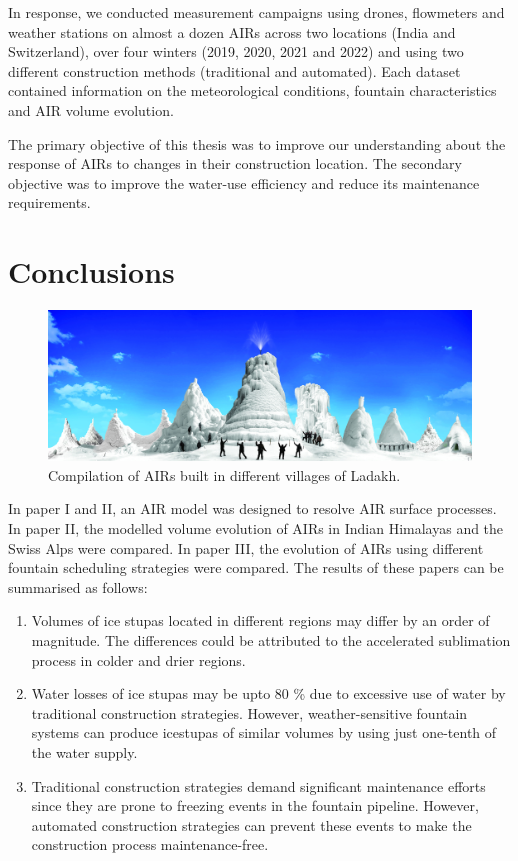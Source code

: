 In response, we conducted measurement campaigns using drones, flowmeters and weather stations on almost a dozen
AIRs across two locations (India and Switzerland), over four winters (2019, 2020, 2021 and 2022) and using two
different construction methods (traditional and automated). Each dataset contained information on the
meteorological conditions, fountain characteristics and AIR volume evolution. 

The primary objective of this thesis was to improve our understanding about the response of AIRs to changes in
their construction location. The secondary objective was to improve the water-use efficiency and reduce its
maintenance requirements.  

\section{Conclusions}

\begin{figure}[htb]
	\includegraphics[width=\textwidth]{figs/AIRs_Ladakh}
	\caption{Compilation of AIRs built in different villages of Ladakh.}
	\label{fig:airs_ladakh}
\end{figure}

In paper I and II, an AIR model was designed to resolve AIR surface processes. In paper II, the modelled volume
evolution of AIRs in Indian Himalayas and the Swiss Alps were compared. In paper III, the evolution of AIRs
using different fountain scheduling strategies were compared. The results of these papers can be summarised as
follows:

\begin{enumerate} 

\item Volumes of ice stupas located in different regions may differ by an order of magnitude. The differences
  could be attributed to the accelerated sublimation process in colder and drier regions.

\item Water losses of ice stupas may be upto 80 \% due to excessive use of water by traditional construction
  strategies. However, weather-sensitive fountain systems can produce icestupas of similar volumes by using just
  one-tenth of the water supply.

\item Traditional construction strategies demand significant maintenance efforts since they are prone to
  freezing events in the fountain pipeline. However, automated construction strategies can prevent these events
  to make the construction process maintenance-free.

\end{enumerate}

